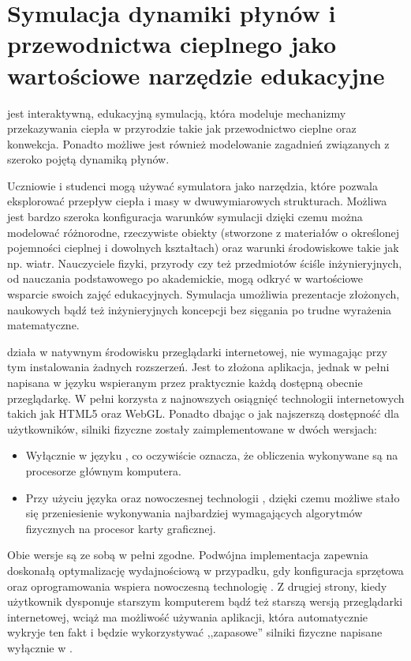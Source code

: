 \chapter{Symulacja dynamiki płynów i przewodnictwa cieplnego jako wartościowe narzędzie edukacyjne}
\label{cha:mozliwosci}

\en jest interaktywną, edukacyjną symulacją, która modeluje mechanizmy
przekazywania ciepła w przyrodzie takie jak przewodnictwo cieplne oraz
konwekcja. Ponadto możliwe jest również modelowanie zagadnień związanych z
szeroko pojętą dynamiką płynów.

Uczniowie i studenci mogą używać symulatora \en jako narzędzia, które pozwala
eksplorować przepływ ciepła i masy w dwuwymiarowych strukturach. Możliwa jest
bardzo szeroka konfiguracja warunków symulacji dzięki czemu można modelować
różnorodne, rzeczywiste obiekty (stworzone z materiałów o określonej pojemności
cieplnej i dowolnych kształtach) oraz warunki środowiskowe takie jak np. wiatr.
Nauczyciele fizyki, przyrody czy też przedmiotów ściśle inżynieryjnych, od
nauczania podstawowego po akademickie, mogą odkryć w \en wartościowe wsparcie
swoich zajęć edukacyjnych. Symulacja umożliwia prezentacje złożonych, naukowych
bądź też inżynieryjnych koncepcji bez sięgania po trudne wyrażenia matematyczne.

\en działa w natywnym środowisku przeglądarki internetowej, nie wymagając przy
tym instalowania żadnych rozszerzeń. Jest to złożona aplikacja, jednak w pełni
napisana w języku \js wspieranym przez praktycznie każdą dostępną obecnie
przeglądarkę. W pełni korzysta z najnowszych osiągnięć technologii internetowych
takich jak HTML5 oraz WebGL. Ponadto dbając o jak najszerszą dostępność dla
użytkowników, silniki fizyczne zostały zaimplementowane w dwóch wersjach:

\begin{itemize} 

\item Wyłącznie w języku \js, co oczywiście oznacza, że obliczenia wykonywane są
na procesorze głównym komputera.

\item Przy użyciu języka \js oraz nowoczesnej technologii , dzięki
czemu możliwe stało się przeniesienie wykonywania najbardziej wymagających
algorytmów fizycznych na procesor karty graficznej.

\end{itemize}

Obie wersje są ze sobą w pełni zgodne. Podwójna implementacja zapewnia doskonałą
optymalizację wydajnościową w przypadku, gdy konfiguracja sprzętowa oraz
oprogramowania wspiera nowoczesną technologię . Z drugiej strony,
kiedy użytkownik dysponuje starszym komputerem bądź też starszą wersją
przeglądarki internetowej, wciąż ma możliwość używania aplikacji, która
automatycznie wykryje ten fakt i będzie wykorzystywać ,,zapasowe'' silniki
fizyczne napisane wyłącznie w \js.

